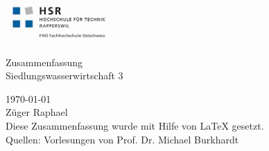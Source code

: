 \documentclass[9pt, openright=false]{scrartcl}
\begin{document}
\begin{titlepage} 
\vspace*{-\topskip}\vspace*{-\headsep} \vspace{-1.4cm}

\includegraphics[height=45pt]{images/HSRLOGO.jpg} 

\vspace{\headsep}\vspace{\topskip}
   \centering 
   \vspace{3cm}
   \fontsize{30pt}{13pt}\selectfont Zusammenfassung \\ \vspace{1cm} Siedlungswasserwirtschaft 3\\ 
   \vspace{1ex} 
   
   \vspace{1cm} 
   \Large  
   \today \\ 
   Züger Raphael \\
   \vspace{1cm} 
  \normalsize
  Diese Zusammenfassung wurde mit Hilfe von {\LaTeX} gesetzt.\\ \vspace{1cm}
   \large 
   \normalsize 
   Quellen: Vorlesungen von Prof. Dr. Michael Burkhardt
   
   
   \clearpage
   \tableofcontents
\end{titlepage} 
\pagebreak
\end{document}
